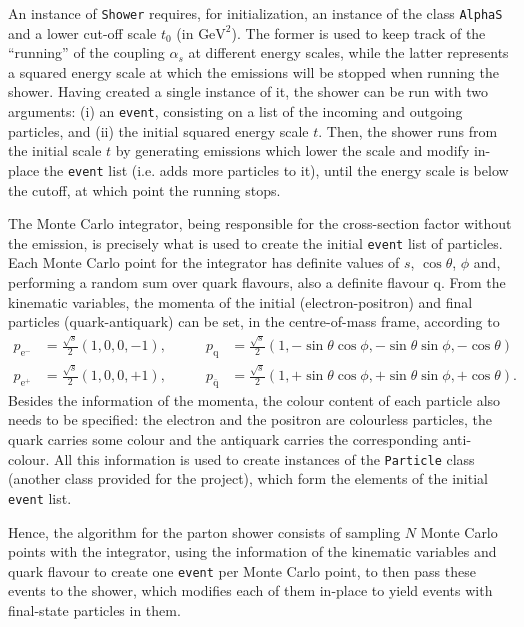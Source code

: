 An instance of \texttt{Shower} requires, for initialization, an instance of the class \texttt{AlphaS} and a lower cut-off scale $t_{0}$ (in $\text{GeV}^{2}$). The former is used to keep track of the “running” of the coupling $\alpha_{s}$ at different energy scales, while the latter represents a squared energy scale at which the emissions will be stopped when running the shower. Having created a single instance of it, the shower can be run with two arguments: (i) an \texttt{event}, consisting on a list of the incoming and outgoing particles, and (ii) the initial squared energy scale $t$. Then, the shower runs from the initial scale $t$ by generating emissions which lower the scale and modify in-place the \texttt{event} list (i.e. adds more particles to it), until the energy scale is below the cutoff, at which point the running stops.

The Monte Carlo integrator, being responsible for the cross-section factor without the emission, is precisely what is used to create the initial \texttt{event} list of particles. Each Monte Carlo point for the integrator has definite values of $s$, $\cos{\theta}$, $\phi$ and, performing a random sum over quark flavours, also a definite flavour q. From the kinematic variables, the momenta of the initial (electron-positron) and final particles (quark-antiquark) can be set, in the centre-of-mass frame, according to
\begin{equation}
    \begin{aligned}
        p_{\mathrm{e}^{-}} & = \frac{\sqrt{s}}{2} (1, 0, 0, -1), & \qquad p_{\mathrm{q}} & = \frac{\sqrt{s}}{2} (1, -\sin{\theta} \cos{\phi}, - \sin{\theta}\sin{\phi}, - \cos{\theta}) \\
        p_{\mathrm{e}^{+}} & = \frac{\sqrt{s}}{2} (1, 0, 0, +1), & \qquad p_{\bar{\mathrm{q}}} & = \frac{\sqrt{s}}{2} (1, +\sin{\theta} \cos{\phi}, + \sin{\theta}\sin{\phi}, + \cos{\theta}).
    \end{aligned}
\end{equation}
Besides the information of the momenta, the colour content of each particle also needs to be specified: the electron and the positron are colourless particles, the quark carries some colour and the antiquark carries the corresponding anti-colour. All this information is used to create instances of the \texttt{Particle} class (another class provided for the project), which form the elements of the initial \texttt{event} list.

Hence, the algorithm for the parton shower consists of sampling $N$ Monte Carlo points with the integrator, using the information of the kinematic variables and quark flavour to create one \texttt{event} per Monte Carlo point, to then pass these events to the shower, which modifies each of them in-place to yield events with final-state particles in them.

